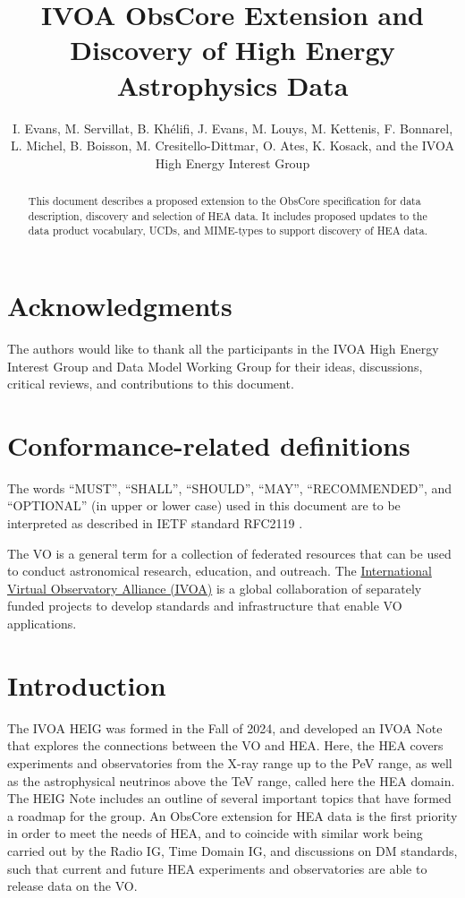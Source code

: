 \documentclass[11pt,a4paper]{ivoa}
\title{IVOA ObsCore Extension and Discovery of High Energy Astrophysics Data}
\author{I. Evans, M. Servillat, B. Khélifi, J. Evans, M. Louys, M. Kettenis, F. Bonnarel, L. Michel, B. Boisson, M. Cresitello-Dittmar, O. Ates, K. Kosack, and the IVOA High Energy Interest Group}
\begin{document}
\begin{abstract}
This document describes a proposed extension to the ObsCore specification for data description, discovery and selection of \gls{HEA} data. It includes proposed updates to the data product vocabulary, UCDs, and MIME-types to support discovery of \gls{HEA} data.
\end{abstract}


\section*{Acknowledgments}

The authors would like to thank all the participants in the IVOA High Energy Interest Group and Data Model Working Group for their ideas, discussions, critical reviews, and contributions to this document.


\section*{Conformance-related definitions}

The words ``MUST'', ``SHALL'', ``SHOULD'', ``MAY'', ``RECOMMENDED'', and ``OPTIONAL'' (in upper or lower case) used in this document are to be interpreted as described in IETF standard RFC2119 \citep{std:RFC2119}.

The \gls{VO} is a general term for a collection of federated resources that can be used to conduct astronomical research, education, and outreach.
The \href{https://www.ivoa.net}{International Virtual Observatory Alliance (IVOA)} is a global collaboration of separately funded projects to develop standards and infrastructure that enable VO applications.


\section{Introduction}

The \gls{IVOA} \gls{HEIG} was formed in the Fall of 2024, and developed an \gls{IVOA} Note \citep{2024ivoa.note.heig} that explores the connections between the \gls{VO} and \gls{HEA}. Here, the \gls{HEA} covers experiments and observatories from the X-ray range up to the PeV range, as well as the astrophysical neutrinos above the TeV range, called here the \gls{HEA} domain. The HEIG Note includes an outline of several important topics that have formed a roadmap for the group. An ObsCore \citep{2017ivoa.spec.0509L} extension for \gls{HEA} data is the first priority in order to meet the needs of HEA, and to coincide with similar work being carried out by the Radio IG, Time Domain IG, and discussions on DM standards, such that current and future \gls{HEA} experiments and observatories are able to release data on the \gls{VO}.
\end{document}
